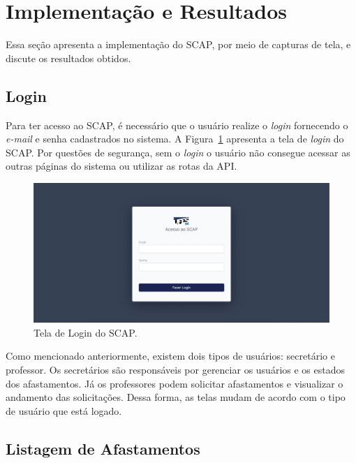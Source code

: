 \section{Implementação e Resultados}
\label{sec-projeto-impl}

Essa seção apresenta a implementação do SCAP, por meio de capturas de tela,
e discute os resultados obtidos.

\subsection{Login}
\label{subsec-projeto-login}

Para ter acesso ao SCAP, é necessário que o usuário realize o \textit{login} fornecendo o \textit{e-mail}
e senha cadastrados no sistema. A Figura~\ref{fig-login} apresenta a tela de \textit{login} do SCAP.
Por questões de segurança, sem o \textit{login} o usuário não consegue acessar as outras páginas do sistema
ou utilizar as rotas da API.

\begin{figure}[h!]
    \centering
    \includegraphics[width=\textwidth]{figuras/prints-app/fig-login.png}
    \caption{Tela de Login do SCAP.}
    \label{fig-login}
\end{figure}

Como mencionado anteriormente, existem dois tipos de usuários: secretário e professor. 
Os secretários são responsáveis por gerenciar os usuários e os estados dos afastamentos.
Já os professores podem solicitar afastamentos e visualizar o andamento das solicitações.
Dessa forma, as telas mudam de acordo com o tipo de usuário que está logado.


\subsection{Listagem de Afastamentos}
\label{subsec-projeto-afastamentos}

